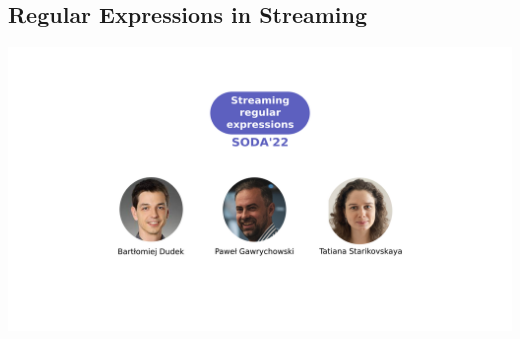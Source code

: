 \subsection{Regular Expressions in Streaming}
\begin{frame}
    \includegraphics[width=\textwidth]{pictures/mindmap/regexp.png}
\end{frame}